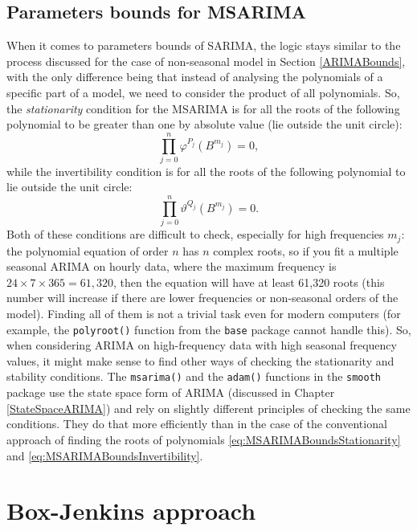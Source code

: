 \documentclass[
]{book}
\theoremstyle{definition}
\theoremstyle{definition}
\theoremstyle{definition}
\theoremstyle{definition}
\theoremstyle{remark}
\begin{document}
\hypertarget{MSARIMABounds}{%
\subsection{Parameters bounds for MSARIMA}\label{MSARIMABounds}}

When it comes to parameters bounds of SARIMA, the logic stays similar to the process discussed for the case of non-seasonal model in Section \ref{ARIMABounds}, with the only difference being that instead of analysing the polynomials of a specific part of a model, we need to consider the product of all polynomials. So, the \emph{stationarity} condition for the MSARIMA is for all the roots of the following polynomial to be greater than one by absolute value (lie outside the unit circle):
\begin{equation}
  \prod_{j=0}^n \varphi^{P_j}(B^{m_j}) = 0,
  \label{eq:MSARIMABoundsStationarity}
\end{equation}
while the invertibility condition is for all the roots of the following polynomial to lie outside the unit circle:
\begin{equation}
  \prod_{j=0}^n \vartheta^{Q_j}(B^{m_j}) = 0.
  \label{eq:MSARIMABoundsInvertibility}
\end{equation}
Both of these conditions are difficult to check, especially for high frequencies \(m_j\): the polynomial equation of order \(n\) has \(n\) complex roots, so if you fit a multiple seasonal ARIMA on hourly data, where the maximum frequency is \(24\times 7\times 365 = 61,320\), then the equation will have at least 61,320 roots (this number will increase if there are lower frequencies or non-seasonal orders of the model). Finding all of them is not a trivial task even for modern computers (for example, the \texttt{polyroot()} function from the \texttt{base} package cannot handle this). So, when considering ARIMA on high-frequency data with high seasonal frequency values, it might make sense to find other ways of checking the stationarity and stability conditions. The \texttt{msarima()} and the \texttt{adam()} functions in the \texttt{smooth} package use the state space form of ARIMA (discussed in Chapter \ref{StateSpaceARIMA}) and rely on slightly different principles of checking the same conditions. They do that more efficiently than in the case of the conventional approach of finding the roots of polynomials \eqref{eq:MSARIMABoundsStationarity} and \eqref{eq:MSARIMABoundsInvertibility}.

\hypertarget{BJApproach}{%
\section{Box-Jenkins approach}\label{BJApproach}}
\end{document}
